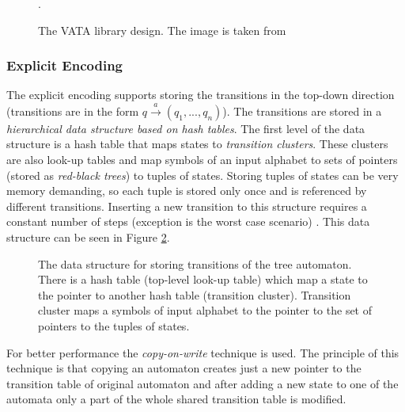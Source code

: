 \begin{figure}
\begin{center}

		\caption{The VATA library design. The image is taken from \cite{libvata}}.
		\label{picVataDesign}
\end{center}
\end{figure}

\subsubsection{Explicit Encoding}
\label{sectionExplicitEnc}
The explicit encoding supports storing the transitions in the top-down direction (transitions are in the form $q \xrightarrow{a} (q_1,...,q_n)$). The transitions
are stored in a \emph{hierarchical data structure based on hash tables}. The first level of the data structure is a hash table
that maps states to \emph{transition clusters}. These clusters are also look-up tables and map symbols of an input alphabet
to sets of pointers (stored as \emph{red-black trees}) to tuples of states. Storing tuples of states can be very memory demanding, so each tuple is stored
only once and is referenced by different transitions. 
Inserting a new transition to this structure requires a constant number of steps (exception is the worst case scenario) %
\cite{libvata}. This data structure can be seen in Figure \ref{figExplicitTreeDataStr}.

\begin{figure}
\begin{center}

    \caption{The data structure for storing transitions of the tree automaton. There is a hash table (top-level look-up table) 
      which map a state to the pointer to another hash table (transition cluster). Transition cluster
      maps a symbols of input alphabet to the pointer to the set of pointers to the tuples of states.}
		\label{figExplicitTreeDataStr}
\end{center}
\end{figure}


For better performance the \emph{copy-on-write} technique \cite{libvata} is used. The principle of this technique is 
that copying an automaton creates just a new pointer to the transition table of original automaton and after adding a new state to one of the automata 
only a part of the whole shared transition table is modified. 

